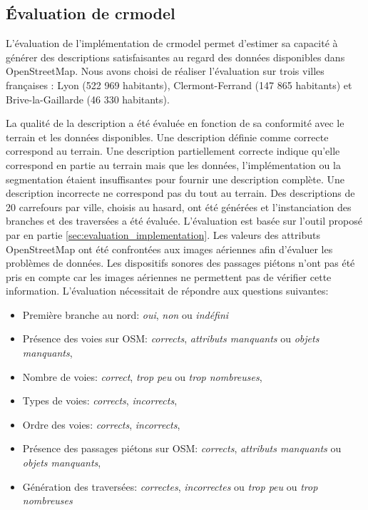\subsection{Évaluation de crmodel}

L'évaluation de l'implémentation de crmodel permet d'estimer sa capacité à générer des descriptions satisfaisantes au regard des données disponibles dans OpenStreetMap. Nous avons choisi de réaliser l'évaluation sur trois villes françaises : Lyon (522 969 habitants), Clermont-Ferrand (147 865 habitants) et Brive-la-Gaillarde (46 330 habitants).

\newpar{}

La qualité de la description a été évaluée en fonction de sa conformité avec le terrain et les données disponibles. Une description définie comme correcte correspond au terrain. Une description partiellement correcte indique qu'elle correspond en partie au terrain mais que les données, l'implémentation ou la segmentation étaient insuffisantes pour fournir une description complète. Une description incorrecte ne correspond pas du tout au terrain. Des descriptions de 20 carrefours par ville, choisis au hasard, ont été générées et l'instanciation des branches et des traversées a été évaluée. L'évaluation est basée sur l'outil proposé par en partie \ref{sec:evaluation_implementation}. Les valeurs des attributs OpenStreetMap ont été confrontées aux images aériennes afin d'évaluer les problèmes de données. Les dispositifs sonores des passages piétons n'ont pas été pris en compte car les images aériennes ne permettent pas de vérifier cette information. L'évaluation nécessitait de répondre aux questions suivantes:
\begin{itemize}
    \item Première branche au nord: \textit{oui}, \textit{non} ou \textit{indéfini}
    \item Présence des voies sur OSM: \textit{corrects}, \textit{attributs manquants} ou \textit{objets manquants},
    \item Nombre de voies: \textit{correct}, \textit{trop peu} ou \textit{trop nombreuses},
    \item Types de voies: \textit{corrects}, \textit{incorrects},
    \item Ordre des voies: \textit{corrects}, \textit{incorrects},
    \item Présence des passages piétons sur OSM: \textit{corrects}, \textit{attributs manquants} ou \textit{objets manquants},
    \item Génération des traversées: \textit{correctes}, \textit{incorrectes} ou \textit{trop peu} ou \textit{trop nombreuses}
\end{itemize}

